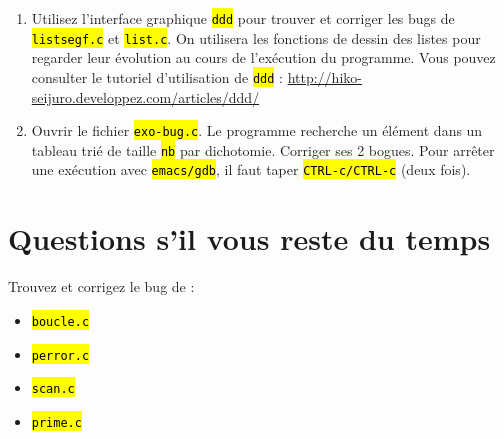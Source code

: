 \documentclass[final, pdftex, a4paper, openbib, ]{article}
\let\OldTexttt\texttt
\renewcommand{\texttt}[1]{\OldTexttt{\hl{#1}}}
\begin{document}
\begin{enumerate}
	\item Utilisez l'interface graphique \texttt{ddd} pour trouver et corriger les bugs de \texttt{listsegf.c} et \texttt{list.c}. On utilisera les fonctions de dessin des listes pour regarder leur évolution au cours de l'exécution du programme. Vous pouvez consulter le tutoriel d'utilisation de \texttt{ddd} : \url{http://hiko-seijuro.developpez.com/articles/ddd/}
	\item Ouvrir le fichier \texttt{exo-bug.c}. Le programme recherche un élément dans un tableau trié de taille \texttt{nb} par dichotomie. Corriger ses 2 bogues. Pour arrêter une exécution avec \texttt{emacs/gdb}, il faut taper \texttt{CTRL-c/CTRL-c} (deux fois).
\end{enumerate}


\section{Questions s’il vous reste du temps}

Trouvez et corrigez le bug de :
\begin{itemize}
	\item \texttt{boucle.c}
	\item \texttt{perror.c}
	\item \texttt{scan.c}
	\item \texttt{prime.c}
\end{itemize}


\end{document}
